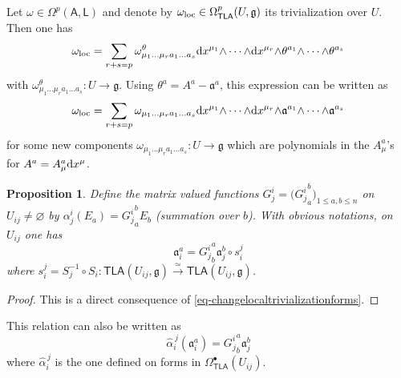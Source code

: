 \documentclass[number]{elsarticle}
\newtheorem{proposition}[theorem]{Proposition}
\theoremstyle{definition}
\theoremstyle{remark}
\numberwithin{equation}{section}
\begin{document}
Let $\omega \in \Omega^p({{{{\mathbf{\mathsf{{A}}}}}}}, {{{{\mathbf{\mathsf{{L}}}}}}})$ and denote by $\omega_{{\text{\textup{loc}}}} \in \Omega^p_{{{{\mathbf{\mathsf{{TLA}}}}}}}(U,{{\mathfrak g}})$ its trivialization over $U$. Then one has
\begin{equation*}
\omega_{{\text{\textup{loc}}}} = \sum_{r+s=p} \omega^{\theta}_{\mu_1 \ldots \mu_r a_1 \ldots a_s} {\text{\textup{d}}} x^{\mu_1} {\mathord{\wedge}} \cdots {\mathord{\wedge}} {\text{\textup{d}}} x^{\mu_r} {\mathord{\wedge}} \theta^{a_1} {\mathord{\wedge}} \cdots {\mathord{\wedge}} \theta^{a_s}
\end{equation*}
with $\omega^{\theta}_{\mu_1 \ldots \mu_r a_1 \ldots a_s} : U \rightarrow {{\mathfrak g}}$.
Using $\theta^a = A^a - {\mathfrak{a}}^a$, this expression can be written as
\begin{equation}
\label{eq-omegalocinmixedbasis}
\omega_{{\text{\textup{loc}}}} = \sum_{r+s=p} \omega_{\mu_1 \ldots \mu_r a_1 \ldots a_s} {\text{\textup{d}}} x^{\mu_1} {\mathord{\wedge}} \cdots {\mathord{\wedge}} {\text{\textup{d}}} x^{\mu_r} {\mathord{\wedge}} {\mathfrak{a}}^{a_1} {\mathord{\wedge}} \cdots {\mathord{\wedge}} {\mathfrak{a}}^{a_s}
\end{equation}
for some new components $\omega_{\mu_1 \ldots \mu_r a_1 \ldots a_s} : U \rightarrow {{\mathfrak g}}$ which are polynomials in the $A^a_\mu$'s for $A^a = A^a_\mu {\text{\textup{d}}} x^{\mu}$.

\begin{proposition}
\label{prop-changetrivialisationmixedbasis}
Define the matrix valued functions $G^{i}_{j}= \big({G^{i}_{j}}^b_a \big)_{1 \leq a,b \leq n}$ on $U_{ij} \neq {{\varnothing}}$ by $\alpha^{i}_{j}(E_a) = {G^{i}_{j}}^b_a E_b$ (summation over $b$). With obvious notations, on $U_{ij}$ one has 
\begin{equation*}
{\mathfrak{a}}_i^a = {G^{i}_{j}}^a_b {\mathfrak{a}}_j^b \circ s_{i}^{j}
\end{equation*}
where $s_{i}^{j} = S_j^{-1} \circ S_i : {{{{\mathbf{\mathsf{{TLA}}}}}}}(U_{ij}, {{\mathfrak g}}) \xrightarrow{\simeq} {{{{\mathbf{\mathsf{{TLA}}}}}}}(U_{ij}, {{\mathfrak g}})$.
\end{proposition}

\begin{proof}
This is a direct consequence of \eqref{eq-changelocaltrivializationforms}.
\end{proof}

This relation can also be written as 
\begin{equation}
\label{eq-relationtriva}
{\widehat{\alpha}}_{i}^{\,j} ({\mathfrak{a}}_i^a) = {G^{i}_{j}}^a_b {\mathfrak{a}}_j^b
\end{equation}
where ${\widehat{\alpha}}_{i}^{\,j}$ is the one defined on forms in $\Omega^{\bullet}_{{{{\mathbf{\mathsf{{TLA}}}}}}}(U_{ij})$. 
\end{document}
